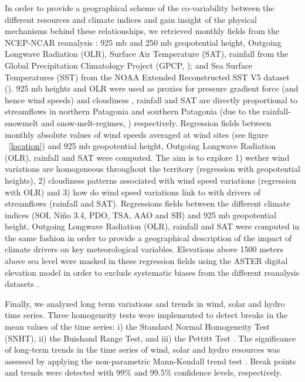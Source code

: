 \documentclass[AMA,Times1COL]{WileyNJDv5} %
\begin{document}
\begin{linenumbers}
In order to provide a geographical scheme of the co-variability between the different resources and climate indices and gain insight of the physical mechanisms behind these relationships, we retrieved monthly fields from the NCEP-NCAR reanalysis \cite{kalnay2018ncep}: 925 mb and 250 mb geopotential height, Outgoing Longwave Radiation (OLR), Surface Air Temperature (SAT), rainfall from the Global Precipitation Climatology Project (GPCP, \cite{adler2003version}); and Sea Surface Temperatures (SST) from the NOAA Extended Reconstructed SST V5 dataset (\cite{huang2017noaa}). 925 mb heights and OLR were used as proxies for pressure gradient force (and hence wind speeds) \cite{alonzo2020probabilistic} and cloudiness \cite{nyakwada1991relationships}, rainfall and SAT are directly proportional to streamflows in northern Patagonia and southern Patagonia (due to the rainfall-snowmelt and snow-melt-regimes, \cite{seoane2007assessing, pasquini2011southern}) respectively. Regression fields between monthly absolute values of wind speeds averaged at wind sites (see figure ~\ref{location}) and 925 mb geopotential height, Outgoing Longwave Radiation (OLR), rainfall and SAT were computed. The aim is to explore 1) wether wind variations are homogeneous throughout the territory (regression with geopotential heights), 2) cloudiness patterns associated with wind speed variations (regression with OLR) and 3) how do wind speed variations link to with drivers of streamflows (rainfall and SAT). Regressions fields between the different climate indices (SOI, Niño 3.4, PDO, TSA, AAO and SB) and 925 mb geopotential height, Outgoing Longwave Radiation (OLR), rainfall and SAT were computed in the same fashion in order to provide a geographical description of the impact of climate drivers on key meteorological variables. Elevations above 1500 meters above sea level were masked in these regression fields using the ASTER digital elevation model \cite{abrams2010aster} in order to exclude systematic biases from the different reanalysis datasets \cite{gao2012elevation, birkel2022evaluation}.

Finally, we analyzed long term variations and trends in wind, solar and hydro time series. Three homogeneity tests were implemented to detect breaks in the mean values of the time series: i) the Standard Normal Homogeneity Test (SNHT), ii) the Buishand Range Test, and iii) the Pettitt Test \cite{ahmad2013homogeneity, bickici2019homogeneity}. The significance of long-term trends in the time series of wind, solar and hydro resources was assessed by applying the non-parametric Mann-Kendall trend test \cite{mcleod2005kendall}. Break points and trends were detected with 99\% and 99.5\% confidence levels, respectively.


\end{linenumbers}
\end{document}
